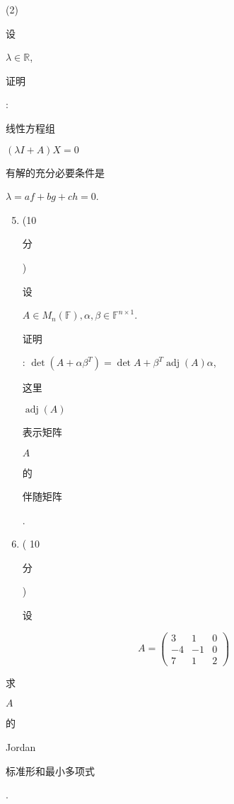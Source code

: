 \documentclass[10pt]{article}
\begin{document}
(2) \begin{CJK}{UTF8}{mj}设\end{CJK} $\lambda \in \mathbb{R}$, \begin{CJK}{UTF8}{mj}证明\end{CJK}: \begin{CJK}{UTF8}{mj}线性方程组\end{CJK} $(\lambda I+A) X=0$ \begin{CJK}{UTF8}{mj}有解的充分必要条件是\end{CJK} $\lambda=a f+b g+c h=0$.

\begin{enumerate}
  \setcounter{enumi}{4}
  \item (10 \begin{CJK}{UTF8}{mj}分\end{CJK}) \begin{CJK}{UTF8}{mj}设\end{CJK} $A \in M_{n}(\mathbb{F}), \alpha, \beta \in \mathbb{F}^{n \times 1}$. \begin{CJK}{UTF8}{mj}证明\end{CJK}: $\operatorname{det}\left(A+\alpha \beta^{T}\right)=\operatorname{det} A+\beta^{T} \operatorname{adj}(A) \alpha$, \begin{CJK}{UTF8}{mj}这里\end{CJK} $\operatorname{adj}(A)$ \begin{CJK}{UTF8}{mj}表示矩阵\end{CJK} $A$ \begin{CJK}{UTF8}{mj}的\end{CJK} \begin{CJK}{UTF8}{mj}伴随矩阵\end{CJK}.

  \item ( 10 \begin{CJK}{UTF8}{mj}分\end{CJK}) \begin{CJK}{UTF8}{mj}设\end{CJK}

\end{enumerate}
$$
A=\left(\begin{array}{ccc}
3 & 1 & 0 \\
-4 & -1 & 0 \\
7 & 1 & 2
\end{array}\right)
$$
\begin{CJK}{UTF8}{mj}求\end{CJK} $A$ \begin{CJK}{UTF8}{mj}的\end{CJK} Jordan \begin{CJK}{UTF8}{mj}标准形和最小多项式\end{CJK}.
\end{document}
